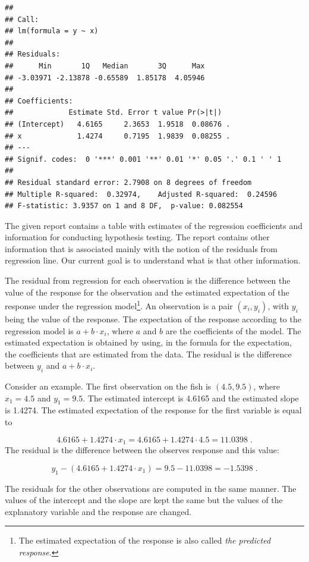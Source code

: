 \documentclass[]{krantz}
\theoremstyle{definition}
\theoremstyle{definition}
\theoremstyle{definition}
\theoremstyle{remark}
\begin{document}
\begin{verbatim}
## 
## Call:
## lm(formula = y ~ x)
## 
## Residuals:
##      Min       1Q   Median       3Q      Max 
## -3.03971 -2.13878 -0.65589  1.85178  4.05946 
## 
## Coefficients:
##             Estimate Std. Error t value Pr(>|t|)  
## (Intercept)   4.6165     2.3653  1.9518  0.08676 .
## x             1.4274     0.7195  1.9839  0.08255 .
## ---
## Signif. codes:  0 '***' 0.001 '**' 0.01 '*' 0.05 '.' 0.1 ' ' 1
## 
## Residual standard error: 2.7908 on 8 degrees of freedom
## Multiple R-squared:  0.32974,    Adjusted R-squared:  0.24596 
## F-statistic: 3.9357 on 1 and 8 DF,  p-value: 0.082554
\end{verbatim}

The given report contains a table with estimates of the regression
coefficients and information for conducting hypothesis testing. The
report contains other information that is associated mainly with the
notion of the residuals from regression line. Our current goal is to
understand what is that other information.

The residual from regression for each observation is the difference
between the value of the response for the observation and the estimated
expectation of the response under the regression model\footnote{The
  estimated expectation of the response is also called \emph{the
  predicted response}.}. An observation is a pair \((x_i,y_i)\), with
\(y_i\) being the value of the response. The expectation of the response
according to the regression model is \(a + b \cdot x_i\), where \(a\)
and \(b\) are the coefficients of the model. The estimated expectation
is obtained by using, in the formula for the expectation, the
coefficients that are estimated from the data. The residual is the
difference between \(y_i\) and \(a + b \cdot x_i\).

Consider an example. The first observation on the fish is
\((4.5, 9.5)\), where \(x_1 = 4.5\) and \(y_1 = 9.5\). The estimated
intercept is 4.6165 and the estimated slope is 1.4274. The estimated
expectation of the response for the first variable is equal to

\[4.6165 + 1.4274 \cdot x_1 = 4.6165 + 1.4274 \cdot 4.5  =  11.0398\;.\]
The residual is the difference between the observes response and this
value:

\[y_1 - (4.6165 + 1.4274 \cdot x_1) = 9.5 - 11.0398 = -1.5398\;.\]

The residuals for the other observations are computed in the same
manner. The values of the intercept and the slope are kept the same but
the values of the explanatory variable and the response are changed.
\end{document}
